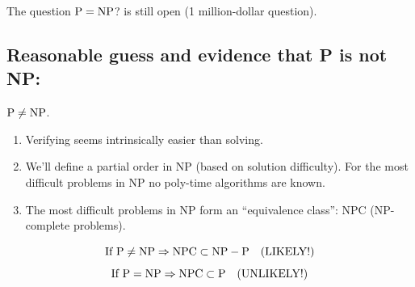 The question $\mathrm{P}=\mathrm{NP}$? is still open (1 million-dollar question).

\subsection{Reasonable guess and evidence that P is not NP:}

$\mathrm{P}\neq\mathrm{NP}$.

\begin{enumerate}
\item Verifying seems intrinsically easier than solving.
\item We'll define a partial order in NP (based on solution difficulty). For the most difficult problems in NP no poly-time algorithms are known.
\item The most difficult problems in NP form an ``equivalence class'': NPC (NP-complete problems).
\end{enumerate}
\[
\text{If }\mathrm{P}\neq\mathrm{NP}\Rightarrow\mathrm{NPC}\subset\mathrm{NP}-\mathrm{P}\quad\text{(LIKELY!)}
\]
\[
\text{If }\mathrm{P}=\mathrm{NP}\Rightarrow\mathrm{NPC}\subset\mathrm{P}\quad\text{(UNLIKELY!)}
\]
